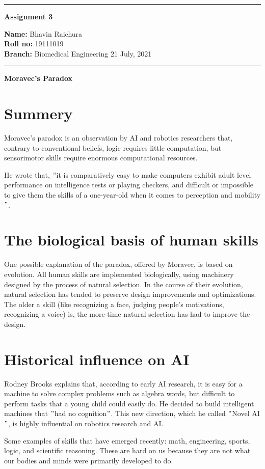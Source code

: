 \documentclass[10pt,a4paper,twoside]{article}
\begin{document}
\begin{center}
\hrule

\vspace{.3cm}
{\bf {\huge Assignment 3}}
\vspace{.3cm}
\end{center}
{\bf Name:}  Bhavin Raichura\\
{\bf Roll no:}  19111019 \\
{\bf Branch: }  Biomedical Engineering \hspace{\fill}  21 July, 2021 \\
\hrule

\vspace{.5cm}
\vspace{.4cm}
{\bf {\Large Moravec's Paradox }}\\
\section{Summery}
Moravec's paradox is an observation by AI and robotics researchers that, contrary to conventional beliefs, logic requires little computation, but sensorimotor skills require enormous computational resources.

\item He wrote that, 
$"$it is comparatively easy to make computers exhibit adult level performance on intelligence tests or playing checkers, and difficult or impossible to give them the skills of a one-year-old when it comes to perception and mobility$"$.

\section{The biological basis of human skills}
One possible explanation of the paradox, offered by Moravec, is based on evolution. All human skills are implemented biologically, using machinery designed by the process of natural selection. In the course of their evolution, natural selection has tended to preserve design improvements and optimizations. The older a skill (like recognizing a face, judging people's motivations, recognizing a voice) is, the more time natural selection has had to improve the design.



\section{Historical influence on AI}
Rodney Brooks explains that, according to early AI research, it is easy for a machine to solve complex problems such as algebra words, but difficult to perform tasks that a young child could easily do.
He decided to build intelligent machines that $"$had no cognition$"$. This new direction, which he called $"$Novel AI$"$, is highly influential on robotics research and AI.
\item Some examples of skills that have emerged recently: math, engineering, sports, logic, and scientific reasoning. These are hard on us because they are not what our bodies and minds were primarily developed to do.
\end{document}
